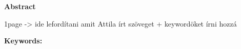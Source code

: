 \thispagestyle{empty}

\begin{center}
	\Large
	\textbf{Abstract}
\end{center}
\vspace{5pt}

	
  1page -> ide lefordítani amit Attila írt szöveget + keywordöket írni hozzá

\textbf{Keywords: } \textit{}
	
\newpage